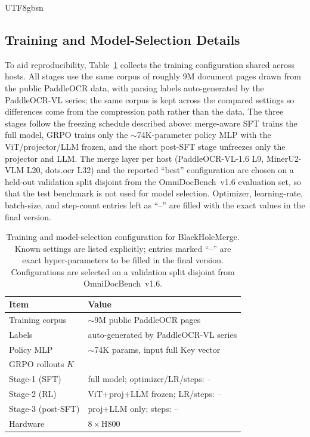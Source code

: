 \documentclass[10pt,twocolumn,letterpaper]{article}
\newcommand{\ours}{BlackHoleMerge}
\begin{document}
\begin{CJK}{UTF8}{gbsn}
\subsection{Training and Model-Selection Details}
To aid reproducibility, Table~\ref{tab:supp_config} collects the training configuration
shared across hosts. All stages use the same corpus of roughly $9$M document pages drawn
from the public PaddleOCR data, with parsing labels auto-generated by the PaddleOCR-VL
series; the same corpus is kept across the compared settings so differences come from the
compression path rather than the data. The three stages follow the freezing schedule
described above: merge-aware SFT trains the full model, GRPO trains only the
$\sim$74K-parameter policy MLP with the ViT/projector/LLM frozen, and the short post-SFT
stage unfreezes only the projector and LLM. The merge layer per host (PaddleOCR-VL-1.6 L9,
MinerU2-VLM L20, dots.ocr L32) and the reported ``best'' configuration are chosen on a
held-out validation split disjoint from the OmniDocBench~v1.6 evaluation set, so that the
test benchmark is not used for model selection. Optimizer, learning-rate, batch-size, and
step-count entries left as ``--'' are filled with the exact values in the final version.

\begin{table}[t]
\centering
\fontsize{7.6}{9}\selectfont
\setlength{\tabcolsep}{4pt}
\begin{tabular}{@{}l >{\raggedright\arraybackslash}p{}@{}}
\toprule
\textbf{Item} & \textbf{Value} \\
\midrule
Training corpus & $\sim$9M public PaddleOCR pages \\
Labels & auto-generated by PaddleOCR-VL series \\
Policy MLP & $\sim$74K params, input full Key vector \\
GRPO rollouts $K$ & 8 \\
Stage-1 (SFT) & full model; optimizer/LR/steps: -- \\
Stage-2 (RL) & ViT+proj+LLM frozen; LR/steps: -- \\
Stage-3 (post-SFT) & proj+LLM only; steps: -- \\
Hardware & $8\times$H800 \\
\bottomrule
\end{tabular}
\caption{Training and model-selection configuration for \ours{}. Known settings are listed
explicitly; entries marked ``--'' are exact hyper-parameters to be filled in the final
version. Configurations are selected on a validation split disjoint from OmniDocBench~v1.6.}
\label{tab:supp_config}
\end{table}


\end{CJK}
\end{document}
